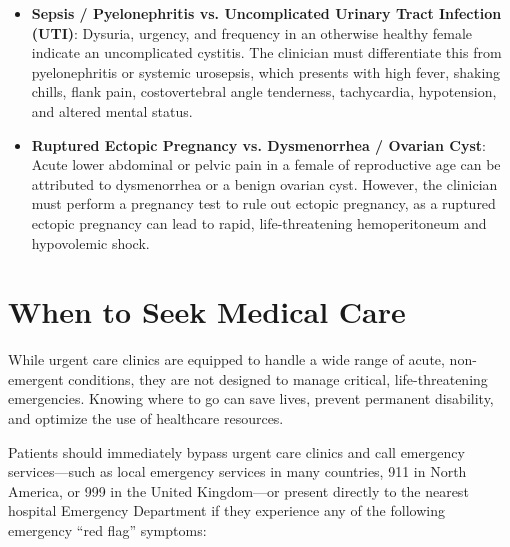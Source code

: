 \begin{itemize}
  \item \textbf{Sepsis / Pyelonephritis vs. Uncomplicated Urinary Tract Infection (UTI)}: Dysuria, urgency, and frequency in an otherwise healthy female indicate an uncomplicated cystitis. The clinician must differentiate this from pyelonephritis or systemic urosepsis, which presents with high fever, shaking chills, flank pain, costovertebral angle tenderness, tachycardia, hypotension, and altered mental status.
  \item \textbf{Ruptured Ectopic Pregnancy vs. Dysmenorrhea / Ovarian Cyst}: Acute lower abdominal or pelvic pain in a female of reproductive age can be attributed to dysmenorrhea or a benign ovarian cyst. However, the clinician must perform a pregnancy test to rule out ectopic pregnancy, as a ruptured ectopic pregnancy can lead to rapid, life-threatening hemoperitoneum and hypovolemic shock.
\end{itemize}

\section*{When to Seek Medical Care}
While urgent care clinics are equipped to handle a wide range of acute, non-emergent conditions, they are not designed to manage critical, life-threatening emergencies. Knowing where to go can save lives, prevent permanent disability, and optimize the use of healthcare resources.

Patients should immediately bypass urgent care clinics and call emergency services---such as local emergency services in many countries, 911 in North America, or 999 in the United Kingdom---or present directly to the nearest hospital Emergency Department if they experience any of the following emergency ``red flag'' symptoms:


